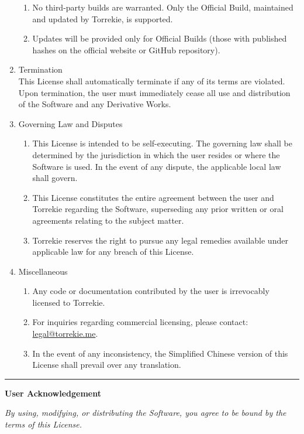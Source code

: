 \documentclass{article}
\begin{document}
\begin{enumerate}
\begin{enumerate}
		\item No third-party builds are warranted. Only the Official Build, maintained and updated by Torrekie, is supported.
		\item Updates will be provided only for Official Builds (those with published hashes on the official website or GitHub repository).
	\end{enumerate}
	\item Termination\\
	This License shall automatically terminate if any of its terms are violated. Upon termination, the user must immediately cease all use and distribution of the Software and any Derivative Works.
	\item Governing Law and Disputes
	\begin{enumerate}
		\item This License is intended to be self-executing. The governing law shall be determined by the jurisdiction in which the user resides or where the Software is used. In the event of any dispute, the applicable local law shall govern.
		\item This License constitutes the entire agreement between the user and Torrekie regarding the Software, superseding any prior written or oral agreements relating to the subject matter.
		\item Torrekie reserves the right to pursue any legal remedies available under applicable law for any breach of this License.
	\end{enumerate}
	\item Miscellaneous
	\begin{enumerate}
		\item Any code or documentation contributed by the user is irrevocably licensed to Torrekie.
		\item For inquiries regarding commercial licensing, please contact: \href{mailto:legal@torrekie.me}{legal@torrekie.me}.
		\item In the event of any inconsistency, the Simplified Chinese version of this License shall prevail over any translation.
	\end{enumerate}
\end{enumerate}
\vspace{4pt}
\hrule
\vspace{1cm}

\textbf{User Acknowledgement}

\emph{By using, modifying, or distributing the Software, you agree to be bound by the terms of this License.}
\end{document}

